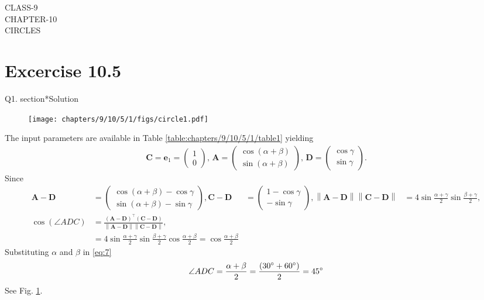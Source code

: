 \documentclass[12pt]{article}
\providecommand{\norm}[1]{\left\lVert#1\right\rVert}
\newcommand{\myvec}[1]{\ensuremath{\begin{pmatrix}#1\end{pmatrix}}}
\let\vec\mathbf
\begin{document}
\begin{center}
\textbf\large{CLASS-9\\CHAPTER-10 \\ CIRCLES}

\end{center}
\section*{Excercise 10.5}

Q1. section*{\large Solution}
\fi
\begin{figure}[H]
\centering
\texttt{[image: chapters/9/10/5/1/figs/circle1.pdf]}
\caption{}
\label{fig:chapters/9/10/5/1/Fig1}
\end{figure}
%
\begin{table}[H]
	\centering
     
	\label{table:chapters/9/10/5/1/table1}
	\end{table}
The input parameters are available in Table
	\ref{table:chapters/9/10/5/1/table1} yielding
\begin{align}
	\vec{C} =\vec{e}_1= \myvec{1\\0},\,
	\vec{A} = \myvec{\cos(\alpha+\beta)\\\sin(\alpha+\beta)},\,
	\vec{D} = \myvec{\cos\gamma\\\sin\gamma}.
\end{align}
Since
\begin{align}
	 \vec{A-D}& = \myvec{\cos(\alpha+\beta) - \cos\gamma\\\sin(\alpha+\beta) - \sin\gamma},
	 \vec{C-D} &= \myvec{1 - \cos\gamma\\-\sin\gamma},
	 \norm{\vec{A-D}}\norm{\vec{C-D}}& = 4 \sin\frac{\alpha+\gamma}2\sin\frac{\beta+\gamma}2,
	 \\
	\cos(\angle ADC) &= \frac{\vec{(A-D)^\top(C-D)}}{\norm{\vec{A-D}}\norm{\vec{C-D}}},
	\label{eq:2}
	\\
	&= 4\sin\frac{\alpha+\gamma}2\sin\frac{\beta+\gamma}2\cos\frac{\alpha+\beta}2
 = \cos\frac{\alpha+\beta}{2}
	\label{eq:7}
\end{align}
Substituting $\alpha$ and $\beta$ in \eqref{eq:7}
\begin{align}
\angle ADC = \frac{\alpha+\beta}{2}=\frac{(30\degree + 60\degree )}{2}=45\degree
\end{align}
See Fig. 
\ref{fig:chapters/9/10/5/1/Fig1}.
\end{document}
